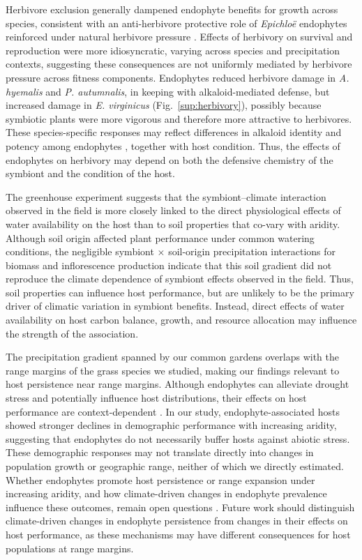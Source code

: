 \documentclass[12pt]{article}\usepackage[]{graphicx}\usepackage[dvipsnames]{xcolor}
\begin{document}
Herbivore exclusion generally dampened endophyte benefits for growth across species, consistent with an anti-herbivore protective role of \textit{Epichloë} endophytes reinforced under natural herbivore pressure \citep{clay1988fungal, decunta2021systematic}. 
Effects of herbivory on survival and reproduction were more idiosyncratic, varying across species and precipitation contexts, suggesting these consequences are not uniformly mediated by herbivore pressure across fitness components. 
Endophytes reduced herbivore damage in \textit{A. hyemalis} and \textit{P. autumnalis}, in keeping with alkaloid-mediated defense, but increased damage in \textit{E. virginicus} (Fig.~\ref{sup:herbivory}), possibly because symbiotic plants were more vigorous and therefore more attractive to herbivores.
These species-specific responses may reflect differences in alkaloid identity and potency among endophytes \citep{siegel1990fungal}, together with host condition. 
Thus, the effects of endophytes on herbivory may depend on both the defensive chemistry of the symbiont and the condition of the host.

The greenhouse experiment suggests that the symbiont--climate interaction observed in the field is more closely linked to the direct physiological effects of water availability on the host than to soil properties that co-vary with aridity. 
Although soil origin affected plant performance under common watering conditions, the negligible symbiont $\times$ soil-origin precipitation interactions for biomass and inflorescence production indicate that this soil gradient did not reproduce the climate dependence of symbiont effects observed in the field. 
Thus, soil properties can influence host performance, but are unlikely to be the primary driver of climatic variation in symbiont benefits. Instead, direct effects of water availability on host carbon balance, growth, and resource allocation may influence the strength of the association. 

The precipitation gradient spanned by our common gardens overlaps with the range margins of the grass species we studied, making our findings relevant to host persistence near range margins. Although endophytes can alleviate drought stress and potentially influence host distributions, their effects on host performance are context-dependent \citep{afkhami2014mutualist}. In our study, endophyte-associated hosts showed stronger declines in demographic performance with increasing aridity, suggesting that endophytes do not necessarily buffer hosts against abiotic stress. These demographic responses may not translate directly into changes in population growth or geographic range, neither of which we directly estimated. Whether endophytes promote host persistence or range expansion under increasing aridity, and how climate-driven changes in endophyte prevalence influence these outcomes, remain open questions \citep{fowler2025increasing,li2026climate}.
Future work should distinguish climate-driven changes in endophyte persistence from changes in their effects on host performance, as these mechanisms may have different consequences for host populations at range margins.
\newpage
\end{document}
